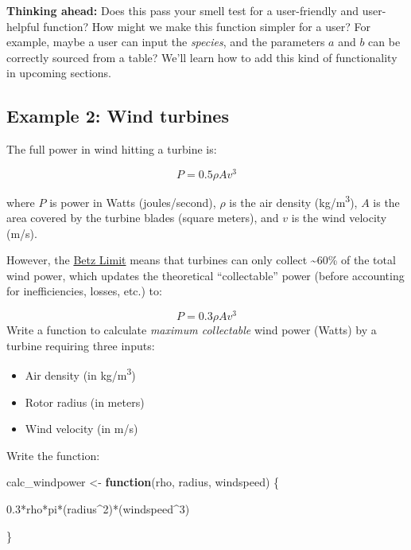 \documentclass[
]{book}
\newenvironment{Shaded}{\begin{snugshade}}{\end{snugshade}}
\newcommand{\ControlFlowTok}[1]{\textcolor[rgb]{0.13,0.29,0.53}{\textbf{#1}}}
\newcommand{\DecValTok}[1]{\textcolor[rgb]{0.00,0.00,0.81}{#1}}
\newcommand{\FloatTok}[1]{\textcolor[rgb]{0.00,0.00,0.81}{#1}}
\newcommand{\NormalTok}[1]{#1}
\newcommand{\OtherTok}[1]{\textcolor[rgb]{0.56,0.35,0.01}{#1}}
\newcommand{\SpecialCharTok}[1]{\textcolor[rgb]{0.00,0.00,0.00}{#1}}
\providecommand{\tightlist}{%
  \setlength{\itemsep}{0pt}\setlength{\parskip}{0pt}}
\begin{document}
\textbf{Thinking ahead:} Does this pass your smell test for a user-friendly and user-helpful function? How might we make this function simpler for a user? For example, maybe a user can input the \emph{species}, and the parameters \(a\) and \(b\) can be correctly sourced from a table? We'll learn how to add this kind of functionality in upcoming sections.

\hypertarget{example-2-wind-turbines}{%
\subsection{Example 2: Wind turbines}\label{example-2-wind-turbines}}

The full power in wind hitting a turbine is:

\[P = 0.5\rho Av^3\]

where \(P\) is power in Watts (joules/second), \(\rho\) is the air density (kg/m\textsuperscript{3}), \(A\) is the area covered by the turbine blades (square meters), and \(v\) is the wind velocity (m/s).

However, the \href{https://energyeducation.ca/encyclopedia/Betz_limit}{Betz Limit} means that turbines can only collect \textasciitilde60\% of the total wind power, which updates the theoretical ``collectable'' power (before accounting for inefficiencies, losses, etc.) to:

\[P = 0.3\rho Av^3\]
Write a function to calculate \emph{maximum collectable} wind power (Watts) by a turbine requiring three inputs:

\begin{itemize}
\tightlist
\item
  Air density (in kg/m\textsuperscript{3})
\item
  Rotor radius (in meters)
\item
  Wind velocity (in m/s)
\end{itemize}

Write the function:

\begin{Shaded}
\begin{Highlighting}[]
\NormalTok{calc\_windpower }\OtherTok{\textless{}{-}} \ControlFlowTok{function}\NormalTok{(rho, radius, windspeed) \{}
  
  \FloatTok{0.3}\SpecialCharTok{*}\NormalTok{rho}\SpecialCharTok{*}\NormalTok{pi}\SpecialCharTok{*}\NormalTok{(radius}\SpecialCharTok{\^{}}\DecValTok{2}\NormalTok{)}\SpecialCharTok{*}\NormalTok{(windspeed}\SpecialCharTok{\^{}}\DecValTok{3}\NormalTok{)}
  
\NormalTok{\}}
\end{Highlighting}
\end{Shaded}
\end{document}
